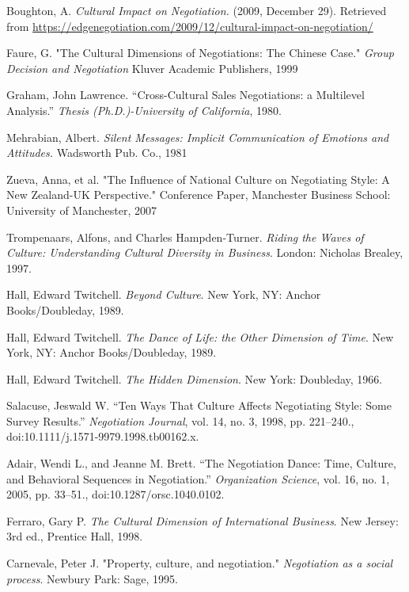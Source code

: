 \documentclass[../main.tex]{subfiles}
\begin{document}
\begin{thebibliography}{9}
 Boughton, A. \textit{Cultural Impact on Negotiation.} (2009, December 29). Retrieved from \url{https://edgenegotiation.com/2009/12/cultural-impact-on-negotiation/}

 Faure, G. "The Cultural Dimensions of Negotiations: The Chinese Case." \textit{Group Decision and Negotiation} Kluver Academic Publishers, 1999

 Graham, John Lawrence. “Cross-Cultural Sales Negotiations: a Multilevel Analysis.” \textit{Thesis (Ph.D.)-University of California}, 1980.

 Mehrabian, Albert. \textit{Silent Messages: Implicit Communication of Emotions and Attitudes.} Wadsworth Pub. Co., 1981

 Zueva, Anna, et al. "The Influence of National Culture on Negotiating Style: A New Zealand-UK Perspective." Conference Paper, Manchester Business School: University of Manchester, 2007

 Trompenaars, Alfons, and Charles Hampden-Turner. \textit{Riding the Waves of Culture: Understanding Cultural Diversity in Business}. London: Nicholas Brealey, 1997.

 Hall, Edward Twitchell. \textit{Beyond Culture}. New York, NY: Anchor Books/Doubleday, 1989. 

 Hall, Edward Twitchell. \textit{The Dance of Life: the Other Dimension of Time}. New York, NY: Anchor Books/Doubleday, 1989.

 Hall, Edward Twitchell. \textit{The Hidden Dimension}. New York: Doubleday, 1966.

 Salacuse, Jeswald W. “Ten Ways That Culture Affects Negotiating Style: Some Survey Results.” \textit{Negotiation Journal}, vol. 14, no. 3, 1998, pp. 221–240., doi:10.1111/j.1571-9979.1998.tb00162.x.

 Adair, Wendi L., and Jeanne M. Brett. “The Negotiation Dance: Time, Culture, and Behavioral Sequences in Negotiation.” \textit{Organization Science}, vol. 16, no. 1, 2005, pp. 33–51., doi:10.1287/orsc.1040.0102.

 Ferraro, Gary P. \textit{The Cultural Dimension of International Business}. New Jersey: 3rd ed., Prentice Hall, 1998.

 Carnevale, Peter J. "Property, culture, and negotiation." \textit{Negotiation as a social process}. Newbury Park: Sage, 1995.



\end{thebibliography}
\end{document}
